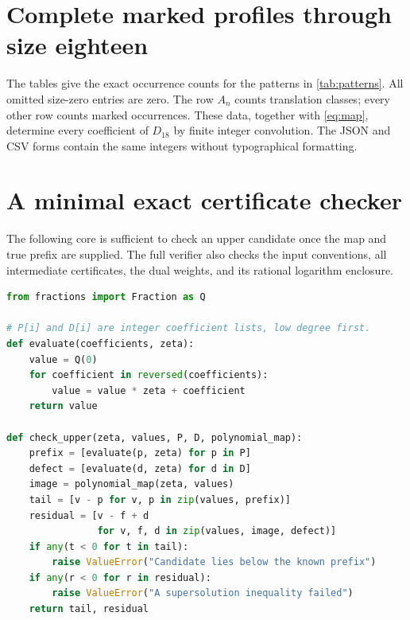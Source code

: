 \documentclass[11pt,a4paper]{article}
\theoremstyle{definition}
\theoremstyle{remark}
\begin{document}
\appendix
\clearpage
\section{Complete marked profiles through size eighteen}
\label{app:data}

The tables give the exact occurrence counts for the patterns in
\cref{tab:patterns}. All omitted size-zero entries are zero. The row $A_n$
counts translation classes; every other row counts marked occurrences.
These data, together with \eqref{eq:map}, determine every coefficient of
$D_{18}$ by finite integer convolution. The JSON and CSV forms contain the
same integers without typographical formatting.

\begin{table}[H]
\centering\footnotesize
\setlength{\tabcolsep}{4pt}
\renewcommand{\arraystretch}{1.12}

\caption{Exact profiles for sizes $1$ through $9$.}
\end{table}

\begin{table}[H]
\centering\footnotesize
\setlength{\tabcolsep}{2.25pt}
\renewcommand{\arraystretch}{1.12}

\caption{Exact profiles for sizes $10$ through $18$.}
\end{table}
\clearpage

\section{A minimal exact certificate checker}
\label{app:checker}
The following core is sufficient to check an upper candidate once the map
and true prefix are supplied. The full verifier also checks the input
conventions, all intermediate certificates, the dual weights, and its
rational logarithm enclosure.
\begin{lstlisting}[language=Python]
from fractions import Fraction as Q

# P[i] and D[i] are integer coefficient lists, low degree first.
def evaluate(coefficients, zeta):
    value = Q(0)
    for coefficient in reversed(coefficients):
        value = value * zeta + coefficient
    return value

def check_upper(zeta, values, P, D, polynomial_map):
    prefix = [evaluate(p, zeta) for p in P]
    defect = [evaluate(d, zeta) for d in D]
    image = polynomial_map(zeta, values)
    tail = [v - p for v, p in zip(values, prefix)]
    residual = [v - f + d
                for v, f, d in zip(values, image, defect)]
    if any(t < 0 for t in tail):
        raise ValueError("Candidate lies below the known prefix")
    if any(r < 0 for r in residual):
        raise ValueError("A supersolution inequality failed")
    return tail, residual
\end{lstlisting}
\end{document}
